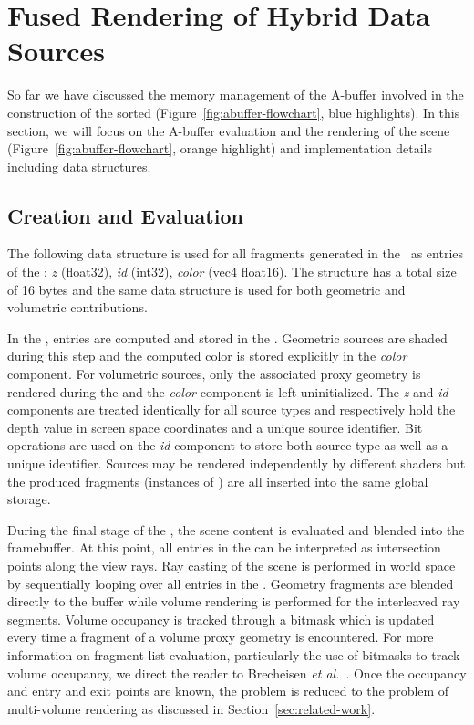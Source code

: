 \documentclass{egpubl}
\def\etal{\emph{et al.}}
\newcommand{\ab}{\mbox{A-buffer}}
\begin{document}
\section{Fused Rendering of Hybrid Data Sources}
\label{sec:fusion}

So far we have discussed the memory management of the \ab{} involved in the construction of the sorted \bFraglist{} (Figure~\ref{fig:abuffer-flowchart}, blue highlights). 
In this section, we will focus on the \ab{} evaluation and the rendering of the scene (Figure~\ref{fig:abuffer-flowchart}, orange highlight) and implementation details including data structures.

\newcommand{\ccz}{\emph{z}}
\newcommand{\ccid}{\emph{id}}
\newcommand{\cccol}{\emph{color}}

\subsection{\bFraglist{} Creation and Evaluation}

The following data structure is used for all fragments generated in the \sFill\ as entries of the \bFraglist: 
\ccz{} (float32), \ccid{} (int32), \cccol{} (vec4 float16).
The structure has a total size of 16 bytes and the same data structure is used for both geometric and volumetric contributions. 

In the \sFill, \abs{} entries are computed and stored in the \bFraglist. 
Geometric sources are shaded during this step and the computed color is stored explicitly in the \cccol{} component. 
For volumetric sources, only the associated proxy geometry is rendered during the \sFill{} and the \cccol{} component is left uninitialized. 
The \ccz{} and \ccid{} components are treated identically for all source types and respectively hold the depth value in screen space coordinates and a unique source identifier. 
Bit operations are used on the \ccid{} component to store both source type as well as a unique identifier. 
Sources may be rendered independently by different shaders but the produced fragments (instances of \abs) are all inserted into the same global storage.

During the final stage of the \sResolve, the scene content is evaluated and blended into the framebuffer. 
At this point, all entries in the \bFraglist{} can be interpreted as intersection points along the view rays. 
Ray casting of the scene is performed in world space by sequentially looping over all entries in the \bFraglist. 
Geometry fragments are blended directly to the buffer while volume rendering is performed for the interleaved ray segments. 
Volume occupancy is tracked through a bitmask which is updated every time a fragment of a volume proxy geometry is encountered. 
For more information on fragment list evaluation, particularly the use of bitmasks to track volume occupancy, we direct the reader to Brecheisen \etal{}~\cite{brecheisen08multimodal}. 
Once the occupancy and entry and exit points are known, the problem is reduced to the problem of multi-volume rendering as discussed in Section~\ref{sec:related-work}. 
\end{document}
